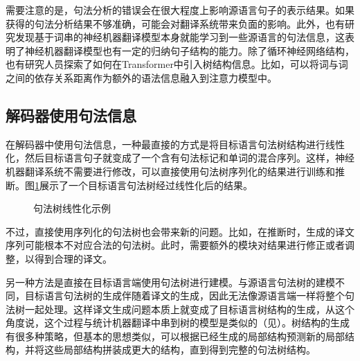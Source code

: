 \parinterval 需要注意的是，句法分析的错误会在很大程度上影响源语言句子的表示结果。如果获得的句法分析结果不够准确，可能会对翻译系统带来负面的影响。此外，也有研究发现基于词串的神经机器翻译模型本身就能学习到一些源语言的句法信息，这表明了神经机器翻译模型也有一定的归纳句子结构的能力。除了循环神经网络结构，也有研究人员探索了如何在Transformer中引入树结构信息。比如，可以将词与词之间的依存关系距离作为额外的语法信息融入到注意力模型中。


\subsection{解码器使用句法信息}\label{subsec-15.3.2}

\parinterval 在解码器中使用句法信息，一种最直接的方式是将目标语言句法树结构进行线性化，然后目标语言句子就变成了一个含有句法标记和单词的混合序列。这样，神经机器翻译系统不需要进行修改，可以直接使用句法树序列化的结果进行训练和推断。图\ref{fig:15-24}展示了一个目标语言句法树经过线性化后的结果。

\begin{figure}[htp]
\centering

\caption{句法树线性化示例}
\label{fig:15-24}
\end{figure}

\parinterval 不过，直接使用序列化的句法树也会带来新的问题。比如，在推断时，生成的译文序列可能根本不对应合法的句法树。此时，需要额外的模块对结果进行修正或者调整，以得到合理的译文。

\parinterval 另一种方法是直接在目标语言端使用句法树进行建模。与源语言句法树的建模不同，目标语言句法树的生成伴随着译文的生成，因此无法像源语言端一样将整个句法树一起处理。这样译文生成问题本质上就变成了目标语言树结构的生成，从这个角度说，这个过程与统计机器翻译中串到树的模型是类似的（见{\chaptereight}）。树结构的生成有很多种策略，但基本的思想类似，可以根据已经生成的局部结构预测新的局部结构，并将这些局部结构拼装成更大的结构，直到得到完整的句法树结构。

